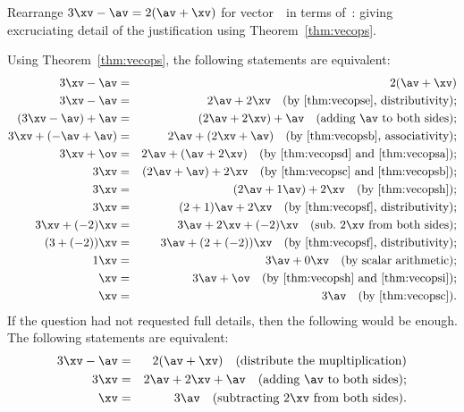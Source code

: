 \begin{example} \label{eg:}
Rearrange \(3\xv-\av=2(\av+\xv)\) for vector~\xv\ in terms of~\av: giving excruciating detail of the justification using Theorem~\ref{thm:vecops}.
\begin{solution} 
Using Theorem~\ref{thm:vecops}, the following statements are equivalent:
\begin{eqnarray*}
3\xv-\av&=&2(\av+\xv)
\\3\xv-\av&=&2\av+2\xv
\quad(\text{by \ref{thm:vecopse}, distributivity});
\\(3\xv-\av)+\av&=&(2\av+2\xv)+\av
\quad(\text{adding \av\ to both sides});
\\3\xv+(-\av+\av)&=&2\av+(2\xv+\av)
\quad(\text{by \ref{thm:vecopsb}, associativity});
\\3\xv+\ov&=&2\av+(\av+2\xv)
\quad(\text{by \ref{thm:vecopsd} and \ref{thm:vecopsa}});
\\3\xv&=&(2\av+\av)+2\xv
\quad(\text{by \ref{thm:vecopsc} and \ref{thm:vecopsb}});
\\3\xv&=&(2\av+1\av)+2\xv
\quad(\text{by \ref{thm:vecopsh}});
\\3\xv&=&(2+1)\av+2\xv
\quad(\text{by \ref{thm:vecopsf}, distributivity});
\\3\xv+(-2)\xv&=&3\av+2\xv+(-2)\xv
\quad(\text{sub.\ \(2\xv\) from both sides});
\\(3+(-2))\xv&=&3\av+(2+(-2))\xv
\quad(\text{by \ref{thm:vecopsf}, distributivity});
\\1\xv&=&3\av+0\xv
\quad(\text{by scalar arithmetic});
\\\xv&=&3\av+\ov
\quad(\text{by \ref{thm:vecopsh} and \ref{thm:vecopsi}});
\\\xv&=&3\av
\quad(\text{by \ref{thm:vecopsc}}).
\end{eqnarray*}
If the question had not requested full details, then the following would be enough.
The following statements are equivalent:
\begin{eqnarray*}
3\xv-\av&=&2(\av+\xv)
\quad(\text{distribute the mupltiplication})
\\3\xv&=&2\av+2\xv+\av
\quad(\text{adding \av\ to both sides});
\\\xv&=&3\av
\quad(\text{subtracting \(2\xv\) from both sides}).
\end{eqnarray*}
\end{solution}
\end{example}








